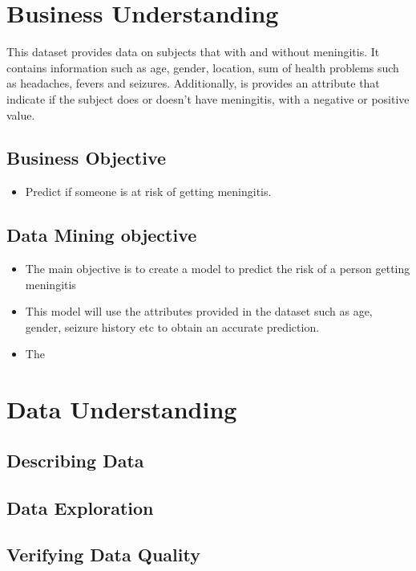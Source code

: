 
\section*{Business Understanding}
This dataset provides data on subjects that with and without meningitis. It contains information such as age, gender, location, sum of health problems such as headaches, fevers and seizures. Additionally, is provides an attribute that indicate if the subject does or doesn't have meningitis, with a negative or positive value. 

\subsection*{Business Objective}

\begin{itemize}
	\item  Predict if someone is at risk of getting meningitis.
\end{itemize}

\subsection*{Data Mining objective}
\begin{itemize}
	\item The main objective is to create a model to predict the risk of a person getting meningitis 
	\item This model will use the attributes provided in the dataset such as age, gender, seizure history etc to obtain an accurate prediction.
	\item The 
\end{itemize}



\section*{Data Understanding}

\subsection*{Describing Data}
\subsection*{Data Exploration}
\subsection*{Verifying Data Quality}



